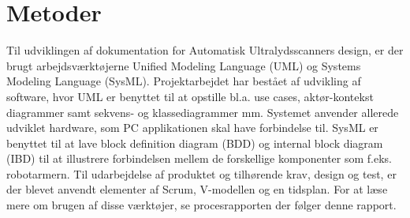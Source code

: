 \chapter{Metoder}\label{Metoder}

Til udviklingen af dokumentation for Automatisk Ultralydsscanners design, er der brugt arbejdsværktøjerne Unified Modeling Language (UML)  og Systems Modeling Language (SysML). Projektarbejdet har bestået af udvikling af software, hvor  UML er benyttet til at opstille bl.a. use cases, aktør-kontekst diagrammer samt sekvens- og klassediagrammer mm. Systemet anvender allerede udviklet hardware, som PC applikationen skal have forbindelse til. SysML er benyttet til at lave block definition diagram (BDD) og internal block diagram (IBD) til at illustrere forbindelsen mellem de forskellige komponenter som f.eks. robotarmern.
\newline
Til udarbejdelse af produktet og tilhørende krav, design og test, er der blevet anvendt elementer af Scrum, V-modellen og en tidsplan. For at læse mere om brugen af disse værktøjer, se procesrapporten der følger denne rapport.
